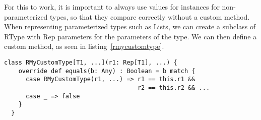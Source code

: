 For this to work, it is important to always use values for  instances
for non-parameterized types, so that they compare correctly without a custom
 method.
When representing parameterized types such as Lists, we can create a subclass
of RType with Rep parameters for the parameters of the type. We can then
define a custom  method, as seen in listing~\ref{rmycustomtype}.

\begin{lstlisting}[float,caption=Pattern for representing parameterized types,label=rmycustomtype]
  class RMyCustomType[T1, ...](r1: Rep[T1], ...) {
    override def equals(b: Any) : Boolean = b match {
      case RMyCustomType(r1, ...) => r1 == this.r1 &&
                                     r2 == this.r2 && ...
      case _ => false
    }
  }
\end{lstlisting}
